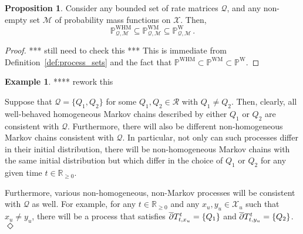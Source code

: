 \documentclass[10pt,a4paper]{paper}
\theoremstyle{definition}
\newtheorem{exmp}{Example}%
\newtheorem{proposition}[theorem]{Proposition}
\newcommand{\reals}{\mathbb{R}}
\newcommand{\realsnonneg}{\reals_{\geq 0}}
\newcommand{\states}{\mathcal{X}}
\newcommand{\processes}{\mathbb{P}}
\newcommand{\wprocesses}{\processes^{\mathrm{W}}}
\newcommand{\wmprocesses}{\processes^{\mathrm{WM}}}
\newcommand{\whmprocesses}{\processes^{\mathrm{WHM}}}
\newcommand{\rateset}{\mathcal{Q}}
\newcommand{\exampleend}{\hfill$\Diamond$}
\begin{document}
\begin{proposition}\label{prop:markov_set_subset_of_nonmarkov_set}
Consider any bounded set of rate matrices $\rateset$, and any non-empty set $\mathcal{M}$ of probability mass functions on $\states$. Then,
\begin{equation*}
\whmprocesses_{\rateset,\mathcal{M}} \subseteq \wmprocesses_{\rateset,\mathcal{M}} \subseteq \wprocesses_{\rateset,\mathcal{M}}\,.
\end{equation*}
\end{proposition}
\begin{proof}
*** still need to check this *** This is immediate from Definition~\ref{def:process_sets} and the fact that $\whmprocesses\subset\wmprocesses\subset\wprocesses$.
\end{proof}


\begin{exmp}\label{example:rateset_not_singleton}
**** rework this

Suppose that $\rateset=\{Q_1,Q_2\}$ for some $Q_1,Q_2\in\mathcal{R}$ with $Q_1\neq Q_2$. Then, clearly, all well-behaved homogeneous Markov chains described by either $Q_1$ or $Q_2$ are consistent with $\rateset$. Furthermore, there will also be different non-homogeneous Markov chains consistent with $\rateset$. In particular, not only can such processes differ in their initial distribution, there will be non-homogeneous Markov chains with the same initial distribution but which differ in the choice of $Q_1$ or $Q_2$ for any given time $t\in\realsnonneg$. 

Furthermore, various non-homogeneous, non-Markov processes will be consistent with $\rateset$ as well. For example, for any $t\in\realsnonneg$ and any $x_u,y_u\in\states_u$ such that $x_u\neq y_u$, there will be a process that satisfies $\smash{\overline{\partial}}T_{t,x_u}^t=\{Q_1\}$ and $\smash{\overline{\partial}}T_{t,y_u}^t=\{Q_2\}$.
\exampleend
\end{exmp}
\end{document}
